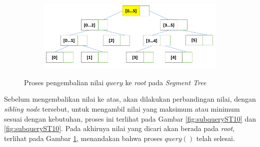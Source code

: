 \begin{figure}[H]
	\begin{subfigure}{.5\textwidth}
		\centering
		\includegraphics[scale=0.3]{assets/images/Query_ST_12.PNG}
		\caption{}
		\label{fig:subqueryST12}
	\end{subfigure}	
	\caption{Proses pengembalian nilai \textit{$query$} ke \textit{root} pada \textit{Segment Tree}}
	\label{fig:queryST3}
\end{figure}
\quad Sebelum mengembalikan nilai ke atas, akan dilakukan perbandingan nilai, dengan \textit{sibling node} tersebut, untuk mengambil nilai yang maksimum atau minimum sesuai dengan kebutuhan, proses ini terlihat pada Gambar \ref{fig:subqueryST10} dan \ref{fig:subqueryST10}. Pada akhirnya nilai yang dicari akan berada pada \textit{root}, terlihat pada Gambar \ref{fig:subqueryST12}, menandakan bahwa proses \textit{$query()$} telah selesai.
 
